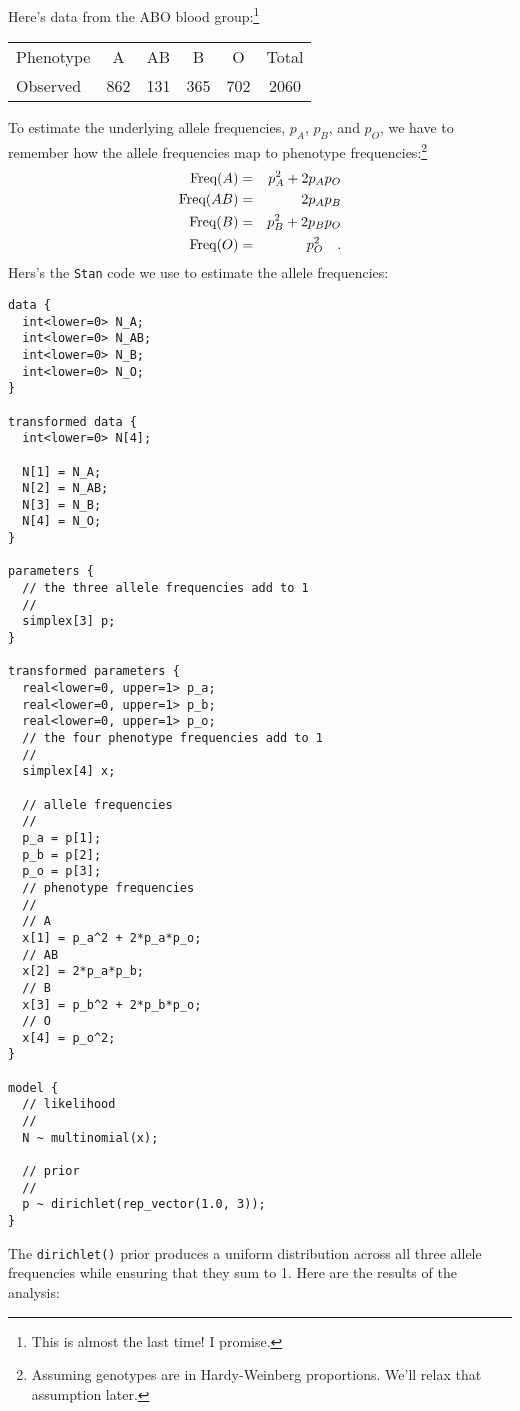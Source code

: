 Here's data from the ABO blood group:\footnote{This is almost the last
time! I promise.}
\begin{center}
\begin{tabular}{l|ccccc}
\hline\hline
Phenotype &   A &  AB &   B &   O & Total \\
Observed  & 862 & 131 & 365 & 702 & 2060 \\
\hline
\end{tabular}
\end{center}
To estimate the underlying allele frequencies, $p_A$, $p_B$, and
$p_O$, we have to remember how the allele frequencies map to phenotype
frequencies:\footnote{Assuming genotypes are in Hardy-Weinberg
  proportions. We'll relax that assumption later.}
\begin{eqnarray*}
\hbox{Freq}(A) &=& p_A^2 + 2p_Ap_O \\
\hbox{Freq}(AB) &=& 2p_Ap_B \\
\hbox{Freq}(B) &=& p_B^2 + 2p_Bp_O \\
\hbox{Freq}(O) &=& p_O^2 \quad .
\end{eqnarray*}
Hers's the {\tt Stan} code we use to estimate the allele
frequencies:
\begin{verbatim}
data {
  int<lower=0> N_A;
  int<lower=0> N_AB;
  int<lower=0> N_B;
  int<lower=0> N_O;
}

transformed data {
  int<lower=0> N[4];

  N[1] = N_A;
  N[2] = N_AB;
  N[3] = N_B;
  N[4] = N_O;
}

parameters {
  // the three allele frequencies add to 1
  //
  simplex[3] p;
}

transformed parameters {
  real<lower=0, upper=1> p_a;
  real<lower=0, upper=1> p_b;
  real<lower=0, upper=1> p_o;
  // the four phenotype frequencies add to 1
  //
  simplex[4] x;

  // allele frequencies
  //
  p_a = p[1];
  p_b = p[2];
  p_o = p[3];
  // phenotype frequencies
  //
  // A
  x[1] = p_a^2 + 2*p_a*p_o;
  // AB
  x[2] = 2*p_a*p_b;
  // B
  x[3] = p_b^2 + 2*p_b*p_o;
  // O
  x[4] = p_o^2;
}

model {
  // likelihood
  //
  N ~ multinomial(x);

  // prior
  //
  p ~ dirichlet(rep_vector(1.0, 3));
}
\end{verbatim}
The {\tt dirichlet()} prior produces a uniform distribution across all
three allele frequencies while ensuring that they sum to 1. Here are
the results of the analysis:
